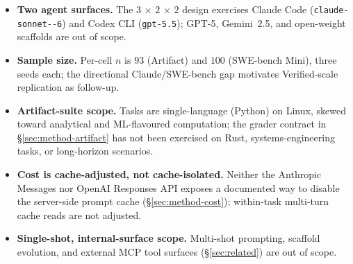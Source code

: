 %

\begin{itemize}

\item \textbf{Two agent surfaces.} The
$3\,{\times}\,2\,{\times}\,2$ design exercises Claude Code
(\texttt{claude-\allowbreak sonnet--6}) and Codex CLI (\texttt{gpt-5.5}); GPT-5,
Gemini~2.5, and open-weight scaffolds are out of scope.

\item \textbf{Sample size.} Per-cell $n$ is $93$ (Artifact) and $100$
(SWE-bench Mini), three seeds each; the directional Claude/SWE-bench
gap motivates Verified-scale replication as follow-up.

\item \textbf{Artifact-suite scope.} Tasks are single-language (Python)
on Linux, skewed toward analytical and ML-flavoured computation; the
grader contract in \S\ref{sec:method-artifact} has not been exercised
on Rust, systems-engineering tasks, or long-horizon scenarios.

\item \textbf{Cost is cache-adjusted, not cache-isolated.} Neither the
Anthropic Messages nor OpenAI Responses API exposes a documented way to
disable the server-side prompt cache (\S\ref{sec:method-cost});
within-task multi-turn cache reads are not adjusted.

\item \textbf{Single-shot, internal-surface scope.} Multi-shot prompting,
scaffold evolution, and external MCP tool surfaces (\S\ref{sec:related})
are out of scope.

\end{itemize}
